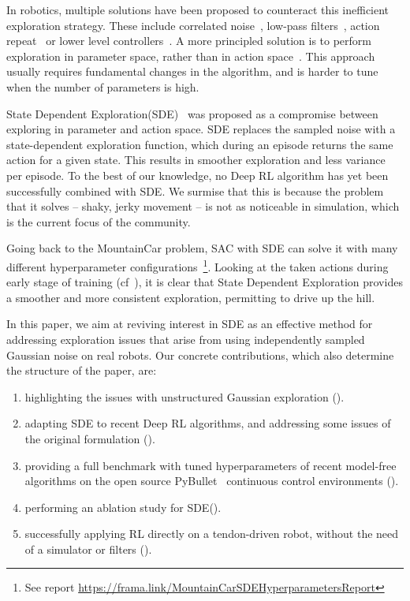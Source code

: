 \documentclass{article}
\newcommand{\sde}{State Dependent Exploration\xspace}
\newcommand{\SDE}{\textsc{SDE}\xspace}
\newcommand{\sac}{\textsc{SAC}\xspace}
\newcommand{\mountaincar}{MountainCar\xspace}
\begin{document}
In robotics, multiple solutions have been proposed to counteract this inefficient exploration strategy. These include correlated noise~\citep{haarnoja2018applications, korenkevych2019autoregressive}, low-pass filters~\citep{haarnoja2018learning, ha2020learning}, action repeat~\citep{neunert2020continuous} or lower level controllers~\citep{haarnoja2018learning, kendall2019learning}.
A more principled solution is to perform exploration in parameter space, rather than in action space~\citep{plappert2017parameter, pourchot2018cem}. This approach usually requires fundamental changes in the algorithm, and is harder to tune when the number of parameters is high. 



\sde (\SDE)~\citep{ruckstiess2008state, ruckstiess2010exploring} was proposed as a compromise between exploring in parameter and action space. \SDE replaces the sampled noise with a state-dependent exploration function, which during an episode returns the same action for a given state. This results in smoother exploration and less variance per episode.
To the best of our knowledge, no Deep RL algorithm has yet been successfully combined with \SDE. We surmise that this is because the problem that it solves -- shaky, jerky movement -- is not as noticeable in simulation, which is the current focus of the community.

Going back to the \mountaincar problem, \sac with \SDE can solve it with many different hyperparameter configurations~\footnote{See report \url{https://frama.link/MountainCarSDEHyperparametersReport}}.
Looking at the taken actions during early stage of training (cf~), it is clear that \sde provides a smoother and more consistent exploration, permitting to drive up the hill.


In this paper, we aim at reviving interest in \SDE as an effective method for addressing exploration issues that arise from using independently sampled Gaussian noise on real robots. Our concrete contributions, which also determine the structure of the paper, are:

\begin{enumerate}
  \item highlighting the issues with unstructured Gaussian exploration ().
  \item adapting \SDE to recent Deep RL algorithms, and addressing some issues of the original formulation ().
  \item providing a full benchmark with tuned hyperparameters of recent model-free algorithms on the open source PyBullet~\citep{coumans2019bullet} continuous control environments ().
  \item performing an ablation study for \SDE ().
  \item successfully applying RL directly on a tendon-driven robot, without the need of a simulator or filters ().
\end{enumerate}
\end{document}
